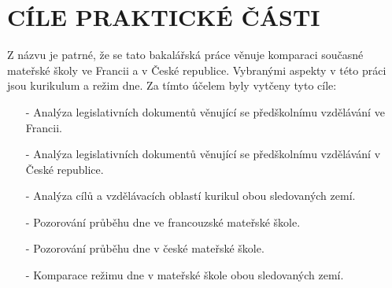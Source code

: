 \chapter{CÍLE PRAKTICKÉ ČÁSTI}
Z názvu je patrné, že se tato bakalářská práce věnuje komparaci současné mateřské školy ve Francii a v České republice. Vybranými aspekty v této práci jsou kurikulum a režim dne. Za tímto účelem byly vytčeny tyto cíle:

\begin{itemize}
	\setlength\itemsep{-2mm}
	\item [-] Analýza legislativních dokumentů věnující se předškolnímu vzdělávání ve Francii.
	\item [-] Analýza legislativních dokumentů věnující se předškolnímu vzdělávání v České republice.
	\item [-] Analýza cílů a vzdělávacích oblastí kurikul obou sledovaných zemí.
	\item [-] Pozorování průběhu dne ve francouzské mateřské škole.
	\item [-] Pozorování průběhu dne v české mateřské škole. 
	\item [-] Komparace režimu dne v mateřské škole obou sledovaných zemí.
\end{itemize}


